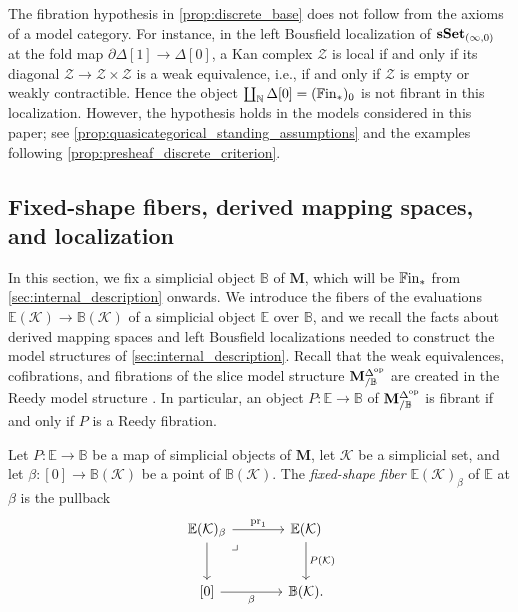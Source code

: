 \documentclass[10pt,reqno]{amsart}
\begin{document}
\begin{rmk}
\label{rem:discrete_base_hypotheses}
The fibration hypothesis in \cref{prop:discrete_base} does not follow
from the axioms of a model category. For instance, in the left
Bousfield localization of $\mathbf{sSet}_{(\infty,0)}$ at the fold map
$\partial\Delta[1]\to\Delta[0]$, a Kan complex $\mathcal Z$ is
local if and only if its diagonal
$\mathcal Z\to\mathcal Z\times\mathcal Z$ is a weak equivalence,
i.e., if and only if $\mathcal Z$ is empty or weakly contractible.
Hence the object $\coprod_{\mathbb N}\Delta[0]=(\mathbb{F}\mathrm{in}_*)_0$ is not
fibrant in this localization. However, the hypothesis holds in the
models considered in this paper; see
\cref{prop:quasicategorical_standing_assumptions} and the examples
following \cref{prop:presheaf_discrete_criterion}.
\end{rmk}


\subsection{Fixed-shape fibers, derived mapping spaces, and localization}
\label{subsec:prelim_model_categories}


In this section, we fix a simplicial object $\mathbb B$ of
$\mathbf M$, which will be $\mathbb{F}\mathrm{in}_*$ from
\cref{sec:internal_description} onwards. We introduce the fibers of
the evaluations $\mathbb E(\mathcal K)\to\mathbb B(\mathcal K)$ of a
simplicial object $\mathbb E$ over $\mathbb B$, and we recall the
facts about derived mapping spaces and left Bousfield localizations
needed to construct the model structures of
\cref{sec:internal_description}. Recall that the weak equivalences,
cofibrations, and fibrations of the slice model structure
$\mathbf M^{\Delta^{\mathrm{op}}}_{/\mathbb B}$ are created in the Reedy model structure
\cite[Theorem~7.6.5\textup{(2)}]{hirschhorn2003model}. In particular,
an object $P:\mathbb E\to\mathbb B$ of $\mathbf M^{\Delta^{\mathrm{op}}}_{/\mathbb B}$ is fibrant
if and only if $P$ is a Reedy fibration.

\begin{definition}
\label{def:fixed_shape_fiber}
Let $P:\mathbb E\to\mathbb B$ be a map of simplicial objects of
$\mathbf M$, let $\mathcal K$ be a simplicial set, and let
$\beta:[0]\to\mathbb B(\mathcal K)$ be a point of
$\mathbb B(\mathcal K)$. The \emph{fixed-shape fiber}
$\mathbb E(\mathcal K)_\beta$ of $\mathbb E$ at $\beta$ is the
pullback
\[
\begin{tikzcd}[ampersand replacement=\&, sep=large]
\mathbb E(\mathcal K)_\beta\arrow[r,"\pr_1"]\arrow[d]
  \arrow[dr,phantom,"\lrcorner",very near start]
\&\mathbb E(\mathcal K)\arrow[d,"P(\mathcal K)"]\\
{[0]}\arrow[r,"\beta"']\&\mathbb B(\mathcal K).
\end{tikzcd}
\]
\end{definition}
\end{document}
